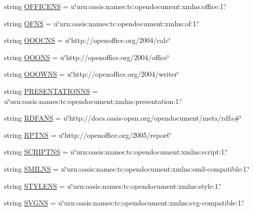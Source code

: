 \begin{DoxyCompactItemize}
\item 
string \hyperlink{namespaceodf_1_1namespaces_ac0bdf67deb1a8159ffdc7497ffd809ee}{O\+F\+F\+I\+C\+E\+N\+S} = u\char`\"{}urn\+:oasis\+:names\+:tc\+:opendocument\+:xmlns\+:office\+:1.\char`\"{}
\item 
string \hyperlink{namespaceodf_1_1namespaces_af5bf6a33e8f0f9e23d002976ae639eec}{O\+F\+N\+S} = u\char`\"{}urn\+:oasis\+:names\+:tc\+:opendocument\+:xmlns\+:of\+:1.\char`\"{}
\item 
string \hyperlink{namespaceodf_1_1namespaces_a60d9bdbf2bffed667186346c8aa076a8}{O\+O\+O\+C\+N\+S} = u\char`\"{}http\+://openoffice.\+org/2004/calc\char`\"{}
\item 
string \hyperlink{namespaceodf_1_1namespaces_a3de5619020c605ca9d6411bb9d6dce52}{O\+O\+O\+N\+S} = u\char`\"{}http\+://openoffice.\+org/2004/office\char`\"{}
\item 
string \hyperlink{namespaceodf_1_1namespaces_a6391fbae7eaafe3a1a7fbb38e5001fc0}{O\+O\+O\+W\+N\+S} = u\char`\"{}http\+://openoffice.\+org/2004/writer\char`\"{}
\item 
string \hyperlink{namespaceodf_1_1namespaces_a326f5b6338cc4018c334e424882b6651}{P\+R\+E\+S\+E\+N\+T\+A\+T\+I\+O\+N\+N\+S} = u\char`\"{}urn\+:oasis\+:names\+:tc\+:opendocument\+:xmlns\+:presentation\+:1.\char`\"{}
\item 
string \hyperlink{namespaceodf_1_1namespaces_a2277c99072ff3a05a0f867164ac05690}{R\+D\+F\+A\+N\+S} = u\char`\"{}http\+://docs.\+oasis-\/open.\+org/opendocument/meta/rdfa\#\char`\"{}
\item 
string \hyperlink{namespaceodf_1_1namespaces_aa19decc412dfa49234ae87fb4222613b}{R\+P\+T\+N\+S} = u\char`\"{}http\+://openoffice.\+org/2005/report\char`\"{}
\item 
string \hyperlink{namespaceodf_1_1namespaces_adbf809d180b9b60e603e9d9f62dc0b98}{S\+C\+R\+I\+P\+T\+N\+S} = u\char`\"{}urn\+:oasis\+:names\+:tc\+:opendocument\+:xmlns\+:script\+:1.\char`\"{}
\item 
string \hyperlink{namespaceodf_1_1namespaces_a60009581c5ffcc49479aa29774c3e433}{S\+M\+I\+L\+N\+S} = u\char`\"{}urn\+:oasis\+:names\+:tc\+:opendocument\+:xmlns\+:smil-\/compatible\+:1.\char`\"{}
\item 
string \hyperlink{namespaceodf_1_1namespaces_a4a82ea4fcc9e0ece518960835ea52bf8}{S\+T\+Y\+L\+E\+N\+S} = u\char`\"{}urn\+:oasis\+:names\+:tc\+:opendocument\+:xmlns\+:style\+:1.\char`\"{}
\item 
string \hyperlink{namespaceodf_1_1namespaces_a336271250de990d3c60711db94bb0213}{S\+V\+G\+N\+S} = u\char`\"{}urn\+:oasis\+:names\+:tc\+:opendocument\+:xmlns\+:svg-\/compatible\+:1.\char`\"{}

\end{DoxyCompactItemize}
